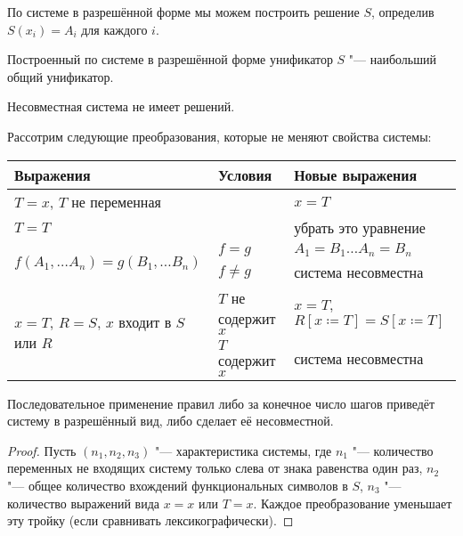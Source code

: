 По системе в разрешённой форме мы можем построить решение $S$, определив $S(x_i) = A_i$ для каждого $i$.

\begin{statement}
    Построенный по системе в разрешённой форме унификатор $S$ "--- наибольший общий унификатор.
\end{statement}

\begin{statement}
    Несовместная система не имеет решений.
\end{statement}

Рассотрим следующие преобразования, которые не меняют свойства системы:
\begin{center}
\begin{tabular}{l l l} \toprule
    Выражения                         & Условия             & Новые выражения \\ \midrule
    $T=x$, $T$ не переменная          &                     & $x=T$ \\ \midrule
    $T=T$                             &                     & убрать это уравнение \\ \midrule
    \multirow{2}{*}[-\aboverulesep]{$f(A_1, \ldots A_n) = g(B_1, \ldots B_n)$}
                                      & $f=g$               & $ A_1 = B_1 \ldots A_n = B_n$ \\ \cmidrule{2-3}
                                      & $f \neq g$          & система несовместна \\ \midrule
    \multirow{2}{*}[-\aboverulesep]{$x=T$, $R=S$, $x$ входит в $S$ или $R$}
                                      & $T$ не содержит $x$ & $x=T$,$R\left[x\coloneqq T\right]=S\left[x\coloneqq T\right]$\\ \cmidrule{2-3}
                                      & $T$ содержит $x$    & система несовместна \\ \bottomrule
\end{tabular}
\end{center}

\begin{statement}
    Последовательное применение правил либо за конечное число шагов приведёт систему в разрешённый вид, либо сделает её несовместной.
\end{statement}

\begin{proof} \todo
    Пусть $(n_1, n_2, n_3)$ "--- характеристика системы, где
    $n_1$ "--- количество переменных не входящих систему только слева от знака равенства один раз,
    $n_2$ "--- общее количество вхождений функциональных символов в $S$,
    $n_3$ "--- количество выражений вида $x=x$ или $T=x$.
    Каждое преобразование уменьшает эту тройку (если сравнивать лексикографически).
\end{proof}

